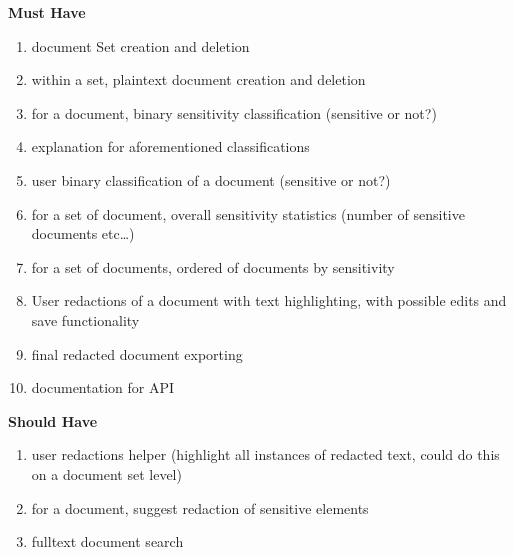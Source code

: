 \documentclass{l4proj}
\begin{document}
\begin{minipage}[t]{.5\linewidth}
    \centerline{\textbf{Must Have}}
    \begin{enumerate}[label=\textbf{M\arabic*}]
        \item document Set creation and deletion
        \item within a set, plaintext document creation and deletion
        \item for a document, binary sensitivity classification (sensitive or not?)
        \item explanation for aforementioned classifications
        \item user binary classification of a document (sensitive or not?)
        \item for a set of document, overall sensitivity statistics (number of sensitive documents etc…)
        \item for a set of documents, ordered of documents by sensitivity
        \item User redactions of a document with text highlighting, with possible edits and save functionality
        \item final redacted document exporting
        \item documentation for API
    \end{enumerate}
\end{minipage}
\hfill
\noindent
\begin{minipage}[t]{.5\linewidth}
    \centerline{\textbf{Should Have}}
    \begin{enumerate}[label=\textbf{S\arabic*}]
        \item user redactions helper (highlight all instances of redacted text, could do this on a document set level)
        \item for a document, suggest redaction of sensitive elements
        \item fulltext document search
    \end{enumerate}
\end{minipage}

\vspace{0.5cm}
\end{document}
